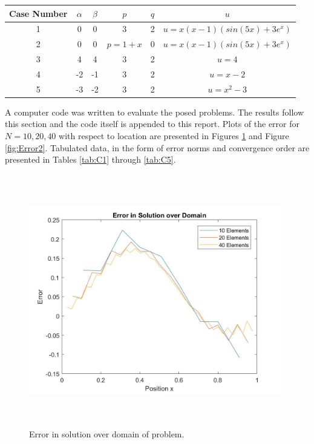 \documentclass[a4paper, 12pt]{article}
\begin{document}
\begin{center}
\begin{tabular}{ |c|c|c|c|c|c|}
  \hline
  Case Number & $\alpha$ & $\beta$ & $p$ & $q$ & $u$ \\
  \hline
  1           &   0      &  0      &  3  &  2  &  $u=x(x-1)(sin(5x)+3e^x)$ \\
  \hline
  2           &   0      &  0      &  $p=1+x$  &  0  &  $u=x(x-1)(sin(5x)+3e^x)$ \\
  \hline
  3           &   4      &  4      &  3  &  2  &  $u=4$ \\
  \hline
  4           &   -2     &  -1     &  3  &  2  &  $u=x-2$ \\
  \hline
  5           &   -3     &  -2     &  3  &  2  &  $u=x^2-3$ \\
  \hline
\end{tabular} \label{tab:Cases}
\end{center}

\noindent
A computer code was written to evaluate the posed problems. 
The results follow this section and the code itself is appended to this report.
Plots of the error for $N = 10, 20, 40$ with respect to location are
presented in Figures \ref{fig:Error1} and Figure \ref{fig:Error2}.
Tabulated data, in the form of error norms and convergence order 
are presented in Tables \ref{tab:C1} through \ref{tab:C5}.

\begin{figure}[H]
  \centering
  \includegraphics[width=11cm, height=11cm]{error}
  \caption{ Error in solution over domain of problem.}
  \label{fig:Error1}
\end{figure}
\end{document}

